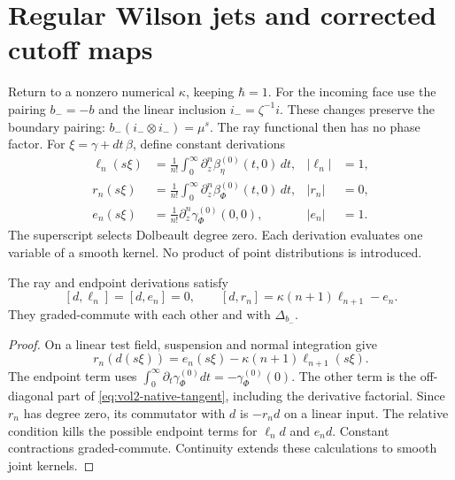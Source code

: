 \section{Regular Wilson jets and corrected cutoff maps}

Return to a nonzero numerical \(\kappa\), keeping \(\hbar=1\).
For the incoming face use the pairing \(b_-=-b\) and the linear inclusion
\(i_- =\zeta^{-1}i\). These changes preserve the boundary pairing:
\(b_-(i_-\otimes i_-)=\mu^s\).
The ray functional then has no phase factor.
For \(\xi=\gamma+dt\,\beta\), define constant derivations
\begin{equation}\label{eq:vol2-native-ray-jets}
 \begin{aligned}
 \ell_n(s\xi)&=\frac1{n!}\int_0^\infty
                  \partial_z^n\beta_\eta^{(0)}(t,0)\,dt,& |\ell_n|&=1,\\
 r_n(s\xi)&=\frac1{n!}\int_0^\infty
                  \partial_z^n\beta_\Phi^{(0)}(t,0)\,dt,& |r_n|&=0,\\
 e_n(s\xi)&=\frac1{n!}\partial_z^n\gamma_\Phi^{(0)}(0,0),& |e_n|&=1.
 \end{aligned}
\end{equation}
The superscript selects Dolbeault degree zero. Each derivation evaluates
one variable of a smooth kernel. No product of point distributions is
introduced.

\begin{lemma}\label{lem:vol2-native-endpoint}
The ray and endpoint derivations satisfy
\begin{equation}\label{eq:vol2-native-endpoint-transgression}
 [d,\ell_n]=[d,e_n]=0,
 \qquad [d,r_n]=\kappa(n+1)\ell_{n+1}-e_n.
\end{equation}
They graded-commute with each other and with \(\Delta_{b_-}\).
\end{lemma}

\begin{proof}
On a linear test field, suspension and normal integration give
\[
 r_n(d(s\xi))=e_n(s\xi)-\kappa(n+1)\ell_{n+1}(s\xi).
\]
The endpoint term uses
\(\int_0^\infty\partial_t\gamma_\Phi^{(0)}dt
=-\gamma_\Phi^{(0)}(0)\). The other term is the off-diagonal part of
\eqref{eq:vol2-native-tangent}, including the derivative factorial.
Since \(r_n\) has degree zero, its commutator with \(d\) is \(-r_nd\)
on a linear input. The relative condition kills the possible endpoint
terms for \(\ell_n d\) and \(e_nd\). Constant contractions graded-commute.
Continuity extends these calculations to smooth joint kernels.
\end{proof}


